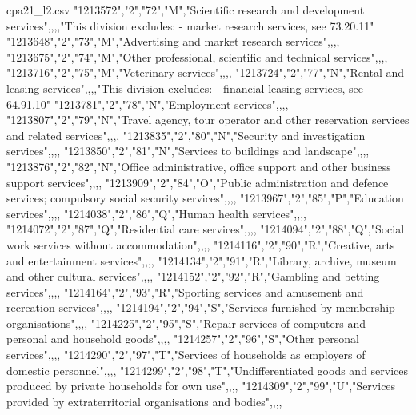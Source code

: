 \begin{filecontents*}{cpa21_l2.csv}
"1213572","2","72","M","Scientific research and development services",,,,"This division excludes:
- market research services, see 73.20.11"
"1213648","2","73","M","Advertising and market research services",,,,
"1213675","2","74","M","Other professional, scientific and technical services",,,,
"1213716","2","75","M","Veterinary services",,,,
"1213724","2","77","N","Rental and leasing services",,,,"This division excludes:
- financial leasing services, see 64.91.10"
"1213781","2","78","N","Employment services",,,,
"1213807","2","79","N","Travel agency, tour operator and other reservation services and related services",,,,
"1213835","2","80","N","Security and investigation services",,,,
"1213850","2","81","N","Services to buildings and landscape",,,,
"1213876","2","82","N","Office administrative, office support and other business support services",,,,
"1213909","2","84","O","Public administration and defence services; compulsory social security services",,,,
"1213967","2","85","P","Education services",,,,
"1214038","2","86","Q","Human health services",,,,
"1214072","2","87","Q","Residential care services",,,,
"1214094","2","88","Q","Social work services without accommodation",,,,
"1214116","2","90","R","Creative, arts and entertainment services",,,,
"1214134","2","91","R","Library, archive, museum and other cultural services",,,,
"1214152","2","92","R","Gambling and betting services",,,,
"1214164","2","93","R","Sporting services and amusement and recreation services",,,,
"1214194","2","94","S","Services furnished by membership organisations",,,,
"1214225","2","95","S","Repair services of computers and personal and household goods",,,,
"1214257","2","96","S","Other personal services",,,,
"1214290","2","97","T","Services of households as employers of domestic personnel",,,,
"1214299","2","98","T","Undifferentiated goods and services produced by private households for own use",,,,
"1214309","2","99","U","Services provided by extraterritorial organisations and bodies",,,,

\end{filecontents*}
